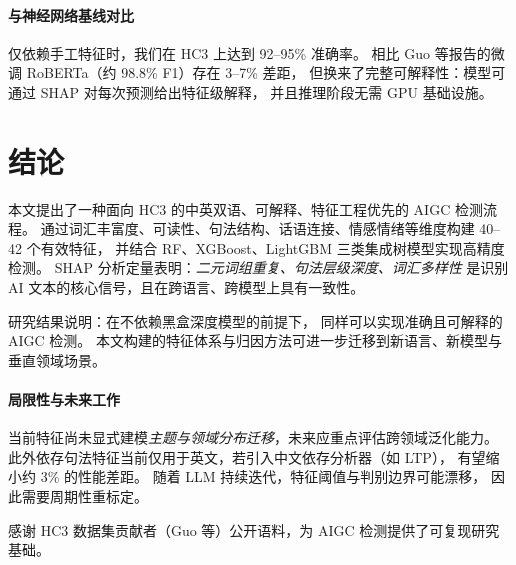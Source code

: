 \documentclass[sigconf]{acmart}
\begin{document}
\paragraph{与神经网络基线对比}
仅依赖手工特征时，我们在 HC3 上达到 92--95\% 准确率。
相比 Guo 等报告的微调 RoBERTa（约 98.8\% F1）存在 3--7\% 差距，
但换来了完整可解释性：模型可通过 SHAP 对每次预测给出特征级解释，
并且推理阶段无需 GPU 基础设施。

\section{结论}

本文提出了一种面向 HC3 的中英双语、可解释、特征工程优先的 AIGC 检测流程。
通过词汇丰富度、可读性、句法结构、话语连接、情感情绪等维度构建 40--42 个有效特征，
并结合 RF、XGBoost、LightGBM 三类集成树模型实现高精度检测。
SHAP 分析定量表明：\emph{二元词组重复、句法层级深度、词汇多样性}
是识别 AI 文本的核心信号，且在跨语言、跨模型上具有一致性。

研究结果说明：在不依赖黑盒深度模型的前提下，
同样可以实现准确且可解释的 AIGC 检测。
本文构建的特征体系与归因方法可进一步迁移到新语言、新模型与垂直领域场景。

\paragraph{局限性与未来工作}
当前特征尚未显式建模\emph{主题与领域分布迁移}，未来应重点评估跨领域泛化能力。
此外依存句法特征当前仅用于英文，若引入中文依存分析器（如 LTP），
有望缩小约 3\% 的性能差距。
随着 LLM 持续迭代，特征阈值与判别边界可能漂移，
因此需要周期性重标定。

\begin{acks}
感谢 HC3 数据集贡献者（Guo 等）公开语料，为 AIGC 检测提供了可复现研究基础。
\end{acks}
\end{document}
